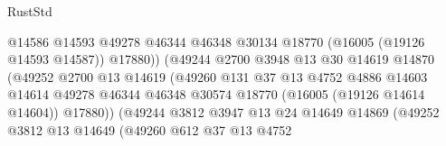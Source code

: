 \begin{lexlean}{RustStd}
\begin{coremodule}
                                            @14586
                                            @14593
                                            @49278
                                            @46344
                                            @46348
                                            @30134
                                            @18770
                                            (@16005 (@19126 @14593 @14587))
                                            @17880))
                                        (@49244
                                          @2700
                                          @3948
                                          @13
                                          @30
                                          @14619
                                          @14870
                                          (@49252
                                            @2700
                                            @13
                                            @14619
                                            (@49260
                                              @131
                                              @37
                                              @13
                                              @4752
                                              @4886
                                              @14603
                                              @14614
                                              @49278
                                              @46344
                                              @46348
                                              @30574
                                              @18770
                                              (@16005 (@19126 @14614 @14604))
                                              @17880))
                                          (@49244
                                            @3812
                                            @3947
                                            @13
                                            @24
                                            @14649
                                            @14869
                                            (@49252
                                              @3812
                                              @13
                                              @14649
                                              (@49260
                                                @612
                                                @37
                                                @13
                                                @4752

\end{coremodule}
\end{lexlean}

